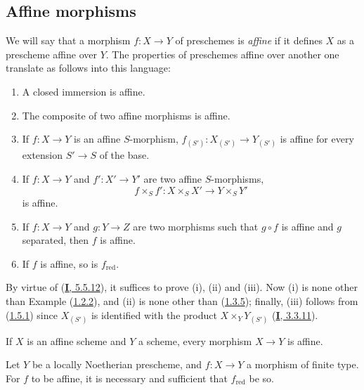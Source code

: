 \subsection{Affine morphisms}
\label{II.1.6}

\begin{env}[1.6.1]
\label{II.1.6.1}
We will say that a morphism $f:X\to Y$ of preschemes is \emph{affine} if it
defines $X$ as a prescheme affine over $Y$. The properties of
preschemes affine over another one translate as follows into this
language:
\end{env}

\begin{proposition}[1.6.2]
\label{II.1.6.2}
\begin{enumerate}
  \item[\rm(i)] A closed immersion is affine.
  \item[\rm(ii)] The composite of two affine morphisms is affine.
  \item[\rm(iii)] If $f:X\to Y$ is an affine $S$-morphism,
    $f_{(S')}:X_{(S')}\to Y_{(S')}$ is affine for every extension $S'\to S$
    of the base.
  \item[\rm(iv)] If $f:X\to Y$ and $f':X'\to Y'$ are two affine
    $S$-morphisms,
    \[
      f\times_S f':X\times_S X'\to Y\times_S Y'
    \]
    is affine.
  \item[\rm(v)] If $f:X\to Y$ and $g:Y\to Z$ are two morphisms such that
    $g\circ f$ is affine and $g$ separated, then $f$ is affine.
  \item[\rm(vi)] If $f$ is affine, so is
    $f_{\mathrm{red}}$.
\end{enumerate}
\end{proposition}

By virtue of (\hyperref[I.5.5.12]{\textbf{I}, 5.5.12}), it suffices to prove (i),
(ii) and (iii). Now (i) is none other than Example
(\hyperref[II.1.2.2]{1.2.2}), and (ii) is none other than
(\hyperref[II.1.3.5]{1.3.5}); finally, (iii) follows from
(\hyperref[II.1.5.1]{1.5.1}) since $X_{(S')}$ is identified with the
product $X\times_Y Y_{(S')}$ (\hyperref[I.3.3.11]{\textbf{I}, 3.3.11}).

\begin{corollary}[1.6.3]
\label{II.1.6.3}
If $X$ is an affine scheme and $Y$ a scheme, every morphism $X\to Y$ is
affine.
\end{corollary}

\begin{proposition}[1.6.4]
\label{II.1.6.4}
Let $Y$ be a locally Noetherian prescheme, and $f:X\to Y$ a morphism of
finite type. For $f$ to be affine, it is necessary and sufficient that
$f_{\mathrm{red}}$ be so.
\end{proposition}

